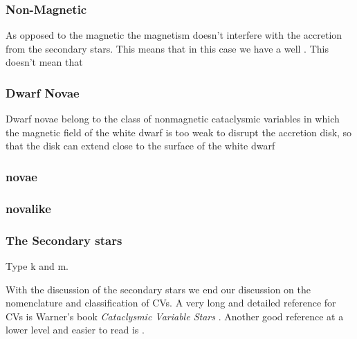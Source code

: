 \subsubsection{Non-Magnetic}

As opposed to the magnetic the magnetism doesn't interfere with the accretion from the secondary stars. This means that in this case we have a well . This doesn't mean that 

\subsubsection{Dwarf Novae}

Dwarf novae belong to the class of nonmagnetic cataclysmic
variables in which the magnetic field of the white dwarf is too
weak to disrupt the accretion disk, so that the disk can extend
close to the surface of the white dwarf 



\subsubsection{novae}

\subsubsection{novalike}

\subsubsection{The Secondary stars}

Type k and m. 

With the discussion of the secondary stars we end our discussion on the nomenclature and classification of CVs. A very long and detailed reference for CVs is Warner's book \emph{Cataclysmic Variable Stars} \citep{warner_cataclysmic_2003}. Another good reference at a lower level and easier to read is \cite{hellier_cataclysmic_2001}.

